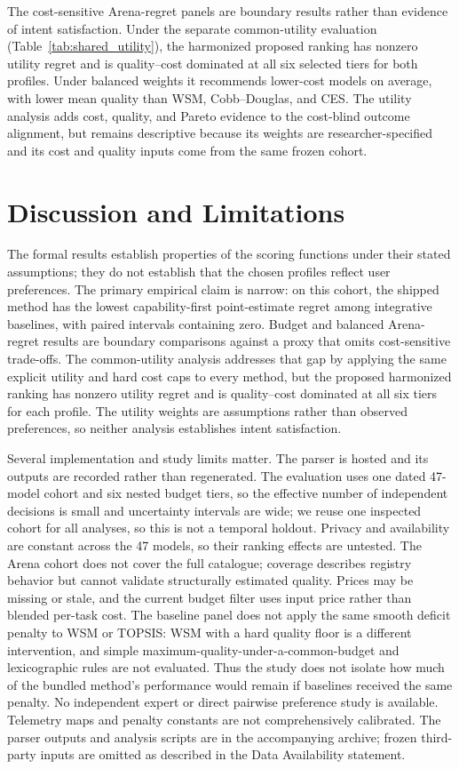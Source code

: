\documentclass[pdflatex,sn-mathphys-num]{sn-jnl}
\theoremstyle{thmstyleone}
\theoremstyle{thmstylethree}
\begin{document}
The cost-sensitive Arena-regret panels are boundary results rather than evidence of intent satisfaction. Under the separate common-utility evaluation (Table~\ref{tab:shared_utility}), the harmonized proposed ranking has nonzero utility regret and is quality--cost dominated at all six selected tiers for both profiles. Under balanced weights it recommends lower-cost models on average, with lower mean quality than WSM, Cobb--Douglas, and CES. The utility analysis adds cost, quality, and Pareto evidence to the cost-blind outcome alignment, but remains descriptive because its weights are researcher-specified and its cost and quality inputs come from the same frozen cohort.

\FloatBarrier

\section{Discussion and Limitations}\label{sec:discussion}

The formal results establish properties of the scoring functions under their stated assumptions; they do not establish that the chosen profiles reflect user preferences. The primary empirical claim is narrow: on this cohort, the shipped method has the lowest capability-first point-estimate regret among integrative baselines, with paired intervals containing zero. Budget and balanced Arena-regret results are boundary comparisons against a proxy that omits cost-sensitive trade-offs. The common-utility analysis addresses that gap by applying the same explicit utility and hard cost caps to every method, but the proposed harmonized ranking has nonzero utility regret and is quality--cost dominated at all six tiers for each profile. The utility weights are assumptions rather than observed preferences, so neither analysis establishes intent satisfaction.

Several implementation and study limits matter. The parser is hosted and its outputs are recorded rather than regenerated. The evaluation uses one dated 47-model cohort and six nested budget tiers, so the effective number of independent decisions is small and uncertainty intervals are wide; we reuse one inspected cohort for all analyses, so this is not a temporal holdout. Privacy and availability are constant across the 47 models, so their ranking effects are untested. The Arena cohort does not cover the full catalogue; coverage describes registry behavior but cannot validate structurally estimated quality. Prices may be missing or stale, and the current budget filter uses input price rather than blended per-task cost. The baseline panel does not apply the same smooth deficit penalty to WSM or TOPSIS: WSM with a hard quality floor is a different intervention, and simple maximum-quality-under-a-common-budget and lexicographic rules are not evaluated. Thus the study does not isolate how much of the bundled method's performance would remain if baselines received the same penalty. No independent expert or direct pairwise preference study is available. Telemetry maps and penalty constants are not comprehensively calibrated. The parser outputs and analysis scripts are in the accompanying archive; frozen third-party inputs are omitted as described in the Data Availability statement.
\end{document}
